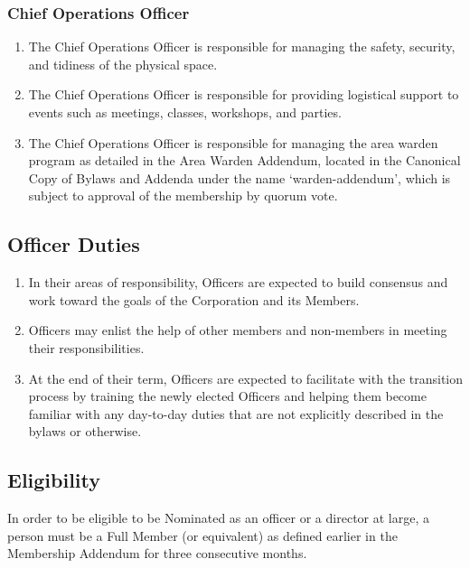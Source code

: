 \documentclass{article}
\begin{document}
  \subsubsection{Chief Operations Officer}
    \begin{enumerate}
      \item The Chief Operations Officer is responsible for managing the safety,
      security, and tidiness of the physical space.
      \item The Chief Operations Officer is responsible for providing logistical
      support to events such as meetings, classes, workshops, and parties.
      \item The Chief Operations Officer is responsible for managing the area warden
      program as detailed in the Area Warden Addendum, located in the Canonical Copy
      of Bylaws and Addenda under the name ‘warden-addendum’, which is subject to
      approval of the membership by quorum vote.
    \end{enumerate}
  \subsection{Officer Duties}
    \begin{enumerate}
      \item In their areas of responsibility, Officers are expected to build consensus
      and work toward the goals of the Corporation and its Members.
      \item Officers may enlist the help of other members and non-members in meeting
      their responsibilities.
      \item At the end of their term, Officers are expected to facilitate with the
      transition process by training the newly elected Officers and helping them
      become familiar with any day-to-day duties that are not explicitly described
      in the bylaws or otherwise.
    \end{enumerate}
  \subsection{Eligibility}
    In order to be eligible to be Nominated as an officer or a director at large, a person must
    be a Full Member (or equivalent) as defined earlier in the Membership Addendum for three
    consecutive months.
\end{document}
